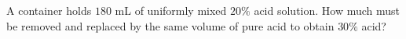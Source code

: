 A container holds $180$ mL of uniformly mixed $20\%$ acid solution. How much must be removed and replaced by the same volume of pure acid to obtain $30\%$ acid?
